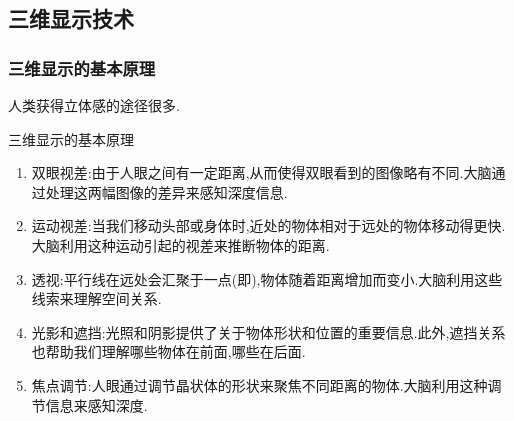 \documentclass{ctexart}
\begin{document}
\subsection{三维显示技术}
\subsubsection{三维显示的基本原理}
人类获得立体感的途径很多.
\begin{other}[原理]{三维显示的基本原理}
    \begin{enumerate}[label=\arabic*.,topsep=0pt,parsep=0pt,itemsep=0pt,partopsep=0pt]
        \item 双眼视差:由于人眼之间有一定距离,从而使得双眼看到的图像略有不同.大脑通过处理这两幅图像的差异来感知深度信息.
        \item 运动视差:当我们移动头部或身体时,近处的物体相对于远处的物体移动得更快.大脑利用这种运动引起的视差来推断物体的距离.
        \item 透视:平行线在远处会汇聚于一点(即),物体随着距离增加而变小.大脑利用这些线索来理解空间关系.
        \item 光影和遮挡:光照和阴影提供了关于物体形状和位置的重要信息.此外,遮挡关系也帮助我们理解哪些物体在前面,哪些在后面.
        \item 焦点调节:人眼通过调节晶状体的形状来聚焦不同距离的物体.大脑利用这种调节信息来感知深度.
    \end{enumerate}
\end{other}
\end{document}
